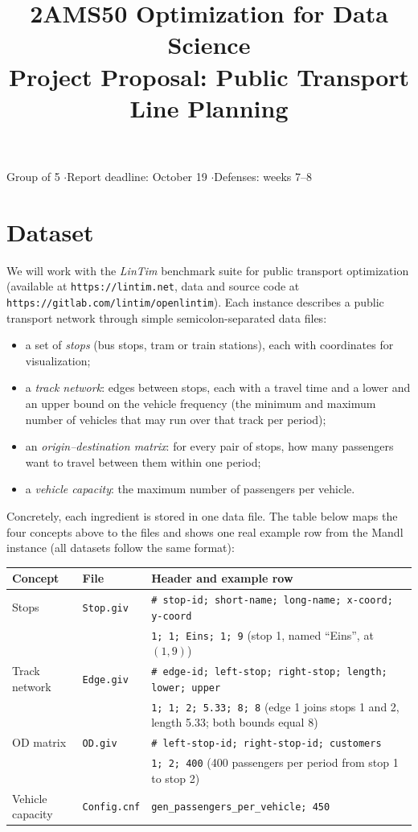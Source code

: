 \documentclass[11pt]{article}
\title{2AMS50 Optimization for Data Science\\[4pt]Project Proposal: Public Transport Line Planning}
\date{}
\begin{document}
\maketitle

\noindent Group of 5 \quad$\cdot$\quad Report deadline: October 19 \quad$\cdot$\quad Defenses: weeks 7--8

\section{Dataset}

We will work with the \emph{LinTim} benchmark suite for public transport optimization (available at \texttt{https://lintim.net}, data and source code at \texttt{https://gitlab.com/lintim/openlintim}). Each instance describes a public transport network through simple semicolon-separated data files:

\begin{itemize}
  \item a set of \emph{stops} (bus stops, tram or train stations), each with coordinates for visualization;
  \item a \emph{track network}: edges between stops, each with a travel time and a lower and an upper bound on the vehicle frequency (the minimum and maximum number of vehicles that may run over that track per period);
  \item an \emph{origin--destination matrix}: for every pair of stops, how many passengers want to travel between them within one period;
  \item a \emph{vehicle capacity}: the maximum number of passengers per vehicle.
\end{itemize}

Concretely, each ingredient is stored in one data file. The table below maps the four concepts above to the files and shows one real example row from the Mandl instance (all datasets follow the same format):

\begin{center}
\begin{tabular}{llp{9.2cm}}
\toprule
Concept & File & Header and example row \\
\midrule
Stops & \texttt{Stop.giv} &
  \texttt{\# stop-id; short-name; long-name; x-coord; y-coord}\\
 & & \texttt{1; 1; Eins; 1; 9} \quad (stop 1, named ``Eins'', at $(1,9)$) \\
Track network & \texttt{Edge.giv} &
  \texttt{\# edge-id; left-stop; right-stop; length; lower; upper}\\
 & & \texttt{1; 1; 2; 5.33; 8; 8} \quad (edge 1 joins stops 1 and 2, length 5.33; both bounds equal 8) \\
OD matrix & \texttt{OD.giv} &
  \texttt{\# left-stop-id; right-stop-id; customers}\\
 & & \texttt{1; 2; 400} \quad (400 passengers per period from stop 1 to stop 2) \\
Vehicle capacity & \texttt{Config.cnf} &
  \texttt{gen\_passengers\_per\_vehicle; 450} \\
\bottomrule
\end{tabular}
\end{center}
\end{document}
